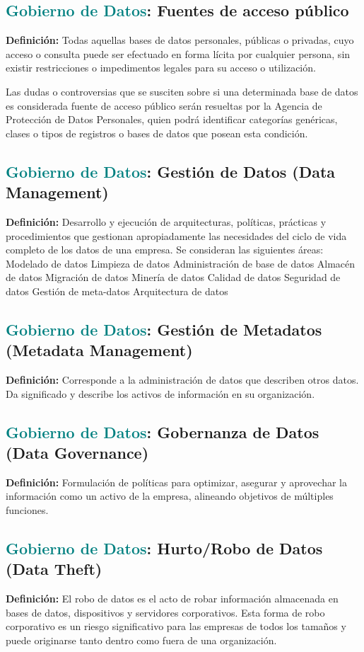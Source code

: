 \documentclass[12pt]{article}
\begin{document}
\subsection{\textcolor{teal}{Gobierno de Datos}: Fuentes de acceso público}
\textbf{Definición:} Todas aquellas bases de datos personales, públicas o privadas, cuyo acceso o consulta puede ser efectuado en forma lícita por cualquier persona, sin existir restricciones o impedimentos legales para su acceso o utilización.

Las dudas o controversias que se susciten sobre si una determinada base de datos es considerada fuente de acceso público serán resueltas por la Agencia de Protección de Datos Personales, quien podrá identificar categorías genéricas, clases o tipos de registros o bases de datos que posean esta condición.
\subsection{\textcolor{teal}{Gobierno de Datos}: Gestión de Datos (Data Management)}
\textbf{Definición:} Desarrollo y ejecución de arquitecturas, políticas, prácticas y procedimientos que gestionan apropiadamente las necesidades del ciclo de vida completo de los datos de una empresa. Se consideran las siguientes áreas:
Modelado de datos
Limpieza de datos
Administración de base de datos
Almacén de datos
Migración de datos
Minería de datos
Calidad de datos
Seguridad de datos
Gestión de meta-datos
Arquitectura de datos
\subsection{\textcolor{teal}{Gobierno de Datos}: Gestión de Metadatos (Metadata Management)}
\textbf{Definición:} Corresponde a la administración de datos que describen otros datos. Da significado y describe los activos de información en su organización.
\subsection{\textcolor{teal}{Gobierno de Datos}: Gobernanza de Datos (Data Governance)}
\textbf{Definición:} Formulación de políticas para optimizar, asegurar y aprovechar la información como un activo de la empresa, alineando objetivos de múltiples funciones.
\subsection{\textcolor{teal}{Gobierno de Datos}: Hurto/Robo de Datos (Data Theft)}
\textbf{Definición:} El robo de datos es el acto de robar información almacenada en bases de datos, dispositivos y servidores corporativos. Esta forma de robo corporativo es un riesgo significativo para las empresas de todos los tamaños y puede originarse tanto dentro como fuera de una organización.
\end{document}
